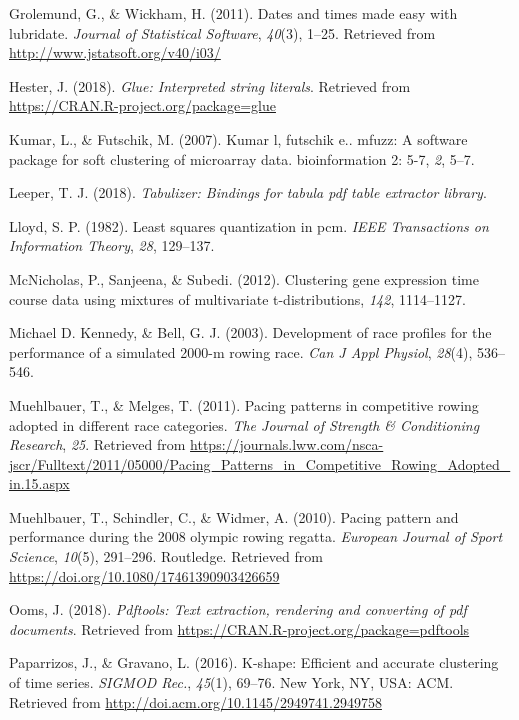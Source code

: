 \documentclass[11pt,]{article}
\begin{document}
\hypertarget{ref-lubridate}{}
Grolemund, G., \& Wickham, H. (2011). Dates and times made easy with
lubridate. \emph{Journal of Statistical Software}, \emph{40}(3), 1--25.
Retrieved from \url{http://www.jstatsoft.org/v40/i03/}

\hypertarget{ref-glue}{}
Hester, J. (2018). \emph{Glue: Interpreted string literals}. Retrieved
from \url{https://CRAN.R-project.org/package=glue}

\hypertarget{ref-Kumar}{}
Kumar, L., \& Futschik, M. (2007). Kumar l, futschik e.. mfuzz: A
software package for soft clustering of microarray data. bioinformation
2: 5-7, \emph{2}, 5--7.

\hypertarget{ref-tabulizer}{}
Leeper, T. J. (2018). \emph{Tabulizer: Bindings for tabula pdf table
extractor library}.

\hypertarget{ref-kmeans}{}
Lloyd, S. P. (1982). Least squares quantization in pcm. \emph{IEEE
Transactions on Information Theory}, \emph{28}, 129--137.

\hypertarget{ref-McNicholas}{}
McNicholas, P., Sanjeena, \& Subedi. (2012). Clustering gene expression
time course data using mixtures of multivariate t-distributions,
\emph{142}, 1114--1127.

\hypertarget{ref-Kennedy}{}
Michael D. Kennedy, \& Bell, G. J. (2003). Development of race profiles
for the performance of a simulated 2000-m rowing race. \emph{Can J Appl
Physiol}, \emph{28}(4), 536--546.

\hypertarget{ref-Muehlbauer_two}{}
Muehlbauer, T., \& Melges, T. (2011). Pacing patterns in competitive
rowing adopted in different race categories. \emph{The Journal of
Strength \& Conditioning Research}, \emph{25}. Retrieved from
\url{https://journals.lww.com/nsca-jscr/Fulltext/2011/05000/Pacing_Patterns_in_Competitive_Rowing_Adopted_in.15.aspx}

\hypertarget{ref-Muehlbauer_one}{}
Muehlbauer, T., Schindler, C., \& Widmer, A. (2010). Pacing pattern and
performance during the 2008 olympic rowing regatta. \emph{European
Journal of Sport Science}, \emph{10}(5), 291--296. Routledge. Retrieved
from \url{https://doi.org/10.1080/17461390903426659}

\hypertarget{ref-pdftools}{}
Ooms, J. (2018). \emph{Pdftools: Text extraction, rendering and
converting of pdf documents}. Retrieved from
\url{https://CRAN.R-project.org/package=pdftools}

\hypertarget{ref-Paparrizos}{}
Paparrizos, J., \& Gravano, L. (2016). K-shape: Efficient and accurate
clustering of time series. \emph{SIGMOD Rec.}, \emph{45}(1), 69--76. New
York, NY, USA: ACM. Retrieved from
\url{http://doi.acm.org/10.1145/2949741.2949758}
\end{document}
